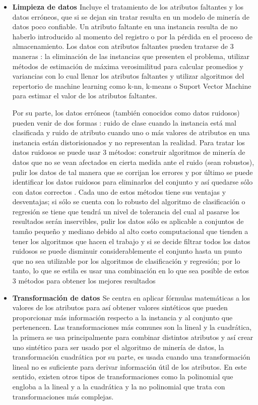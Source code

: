 \begin{itemize}
\item \textbf{Limpieza de datos \cite{garcia2016data, kim2003taxonomy}}
Incluye el tratamiento de los atributos faltantes y los datos erróneos, que si se dejan sin tratar resulta en un modelo de minería de datos poco confiable. Un atributo faltante en una instancia resulta de no haberlo introducido al momento del registro o por la pérdida en el proceso de almacenamiento. Los datos con atributos faltantes pueden tratarse de 3 maneras \cite{farhangfar2007novel}: la eliminación de las instancias que presenten el problema, utilizar métodos de estimación de máxima verosimilitud para calcular promedios y variancias con lo cual llenar los atributos faltantes y utilizar algoritmos del repertorio de machine learning como k-nn, k-means o Suport Vector Machine para estimar el valor de los atributos faltantes. 

Por su parte, los datos erróneos (también conocidos como datos ruidosos) pueden venir de dos formas \cite{catal2011class}: ruido de clase cuando la instancia está mal clasificada y ruido de atributo cuando uno o más valores de atributos en una instancia están distorisionados y no representan la realidad. Para tratar los datos ruidosos se puede usar 3 métodos: construir algoritmos de minería de datos que no se vean afectados en cierta medida ante el ruido (sean robustos), pulir los datos \cite{teng1999correcting} de tal manera que se corrijan los errores y por último se puede identificar los datos ruidosos para eliminarlos del conjunto y así quedarse sólo con datos correctos \cite{brodley1999identifying}. Cada uno de estos métodos tiene sus ventajas y desventajas; si sólo se cuenta con lo robusto del algoritmo de clasificación o regresión se tiene que tendrá un nivel de tolerancia del cual al pasarse los resultados serán inservibles, pulir los datos sólo es aplicable a conjuntos de tamño pequeño y mediano debido al alto costo computacional que tienden a tener los algoritmos que hacen el trabajo y si se decide filtrar todos los datos ruidosos se puede disminuir considerablemente el conjunto hasta un punto que no sea utilizable por los algoritmos de clasificación y regresión; por lo tanto, lo que se estila es usar una combinación en lo que sea posible de estos 3 métodos para obtener los mejores resultados

\item \textbf{Transformación de datos \cite{garcia2016data}}
Se centra en aplicar fórmulas matemáticas a los valores de los atributos para así obtener valores sintéticos que pueden proporcionar más información respecto a la instancia y al conjunto que pertenencen. Las transformaciones más comunes son la lineal y la cuadrática, la primera se usa principalmente para combinar distintos atributos y así crear uno sintético para ser usado por el algoritmo de minería de datos, la transformación cuadrática por su parte, es usada cuando una transformación lineal no es suficiente para derivar información útil de los atributos. En este sentido, existen otros tipos de transformaciones como la polinomial que engloba a la lineal y a la cuadrática y la no polinomial que trata con transformaciones más complejas.


\end{itemize}
